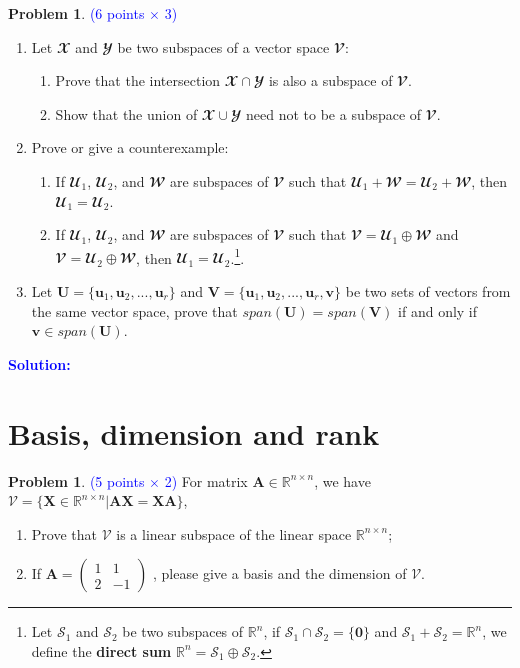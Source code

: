 \documentclass[english,onecolumn]{IEEEtran}
\newcommand{\Ub}{\mathbf{U}}
\newcommand{\Vb}{\mathbf{V}}
\newcommand{\ub}{\mathbf{u}}
\newcommand{\vb}{\mathbf{v}}
\newcommand{\Ucal}{\mathbfcal{U}}
\newcommand{\Wcal}{\mathbfcal{W}}
\newcommand{\Vcal}{\mathbfcal{V}}
\newcommand{\Xcal}{\mathbfcal{X}}
\newcommand{\Ycal}{\mathbfcal{Y}}
\begin{document}
\noindent\textbf{Problem 1}. \textcolor{blue}{(6 points $\times$ 3)}
\begin{enumerate}
    \item Let $\Xcal$ and $\Ycal$ be two subspaces of a vector space $\Vcal$:
    \begin{enumerate}
        \item Prove that the intersection $\Xcal\cap\Ycal$ is also a subspace of $\Vcal$.
        \item Show that the union of $\Xcal\cup\Ycal$ need not to be a subspace of $\Vcal$.
    \end{enumerate}
    \item Prove or give a counterexample:
    \begin{enumerate}
        \item If $\Ucal_1$, $\Ucal_2$, and $\Wcal$ are subspaces of $\Vcal$ such that $\Ucal_1+\Wcal = \Ucal_2+\Wcal$, then $\Ucal_1 = \Ucal_2$.
        \item If $\Ucal_1$, $\Ucal_2$, and $\Wcal$ are subspaces of $\Vcal$ such that $\Vcal = \Ucal_1 \oplus \Wcal$ and $\Vcal = \Ucal_2 \oplus \Wcal$, then $\Ucal_1 = \Ucal_2$.\footnote{Let $\mathcal{S}_1$ and $\mathcal{S}_2$ be two subspaces of $\mathbb{R}^n$, if $\mathcal{S}_1 \cap \mathcal{S}_2 = \{ \mathbf{0}\}$ and $\mathcal{S}_1 + \mathcal{S}_2 = \mathbb{R}^n$, we define the \textbf{direct sum} $\mathbb{R}^n = \mathcal{S}_1 \oplus \mathcal{S}_2.$}.
    \end{enumerate}
    \item Let $\Ub = \{\ub_1,\ub_2,...,\ub_r\}$ and $\Vb = \{\ub_1,\ub_2,...,\ub_r,\vb\}$ be two sets of vectors from the same vector space, prove that $span(\Ub) = span(\Vb)$ if and only if $\vb\in span(\Ub)$.
\end{enumerate}

\noindent\textcolor{blue}{
	\textbf{Solution:}
}

\newpage

\section{Basis, dimension and rank}
\noindent\textbf{Problem 1}. \textcolor{blue}{(5 points $\times$ 2)}
For matrix $\mathbf{A}\in\mathbb{R}^{n\times n}$, we have $\mathcal{V} = \{\mathbf{X} \in \mathbb{R}^{n\times n}|\mathbf{AX}=\mathbf{XA}\}$,
\begin{enumerate}
	\item Prove that $\mathcal{V}$ is a linear subspace of the linear space $\mathbb{R}^{n\times n}$;
	\item If $\mathbf{A} = \left( 
  \begin{array}{ccc}  
    1 & 1\\  
    2 & -1 
  \end{array}
\right)  $ , please give a basis and the dimension of $\mathcal{V}$.
\end{enumerate}
\end{document}
